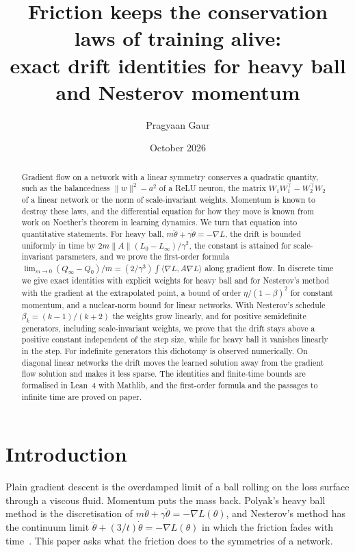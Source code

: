 \documentclass[11pt]{article}
\title{Friction keeps the conservation laws of training alive:\\ exact drift identities for heavy ball and Nesterov momentum}
\author{Pragyaan Gaur}
\date{October 2026}
\theoremstyle{remark}
\theoremstyle{definition}
\newcommand{\ip}[2]{\langle #1,#2\rangle}
\begin{document}
\maketitle

\begin{abstract}
Gradient flow on a network with a linear symmetry conserves a quadratic quantity, such as the balancedness $\|w\|^2-a^2$ of a ReLU neuron, the matrix $W_1W_1^\top-W_2^\top W_2$ of a linear network or the norm of scale-invariant weights. Momentum is known to destroy these laws, and the differential equation for how they move is known from work on Noether's theorem in learning dynamics. We turn that equation into quantitative statements. For heavy ball, $m\ddot\theta+\gamma\dot\theta=-\nabla L$, the drift is bounded uniformly in time by $2m\|A\|(L_0-L_\infty)/\gamma^2$, the constant is attained for scale-invariant parameters, and we prove the first-order formula $\lim_{m\to0}(Q_\infty-Q_0)/m=(2/\gamma^3)\int\ip{\nabla L}{A\nabla L}$ along gradient flow. In discrete time we give exact identities with explicit weights for heavy ball and for Nesterov's method with the gradient at the extrapolated point, a bound of order $\eta/(1-\beta)^2$ for constant momentum, and a nuclear-norm bound for linear networks. With Nesterov's schedule $\beta_k=(k-1)/(k+2)$ the weights grow linearly, and for positive semidefinite generators, including scale-invariant weights, we prove that the drift stays above a positive constant independent of the step size, while for heavy ball it vanishes linearly in the step. For indefinite generators this dichotomy is observed numerically. On diagonal linear networks the drift moves the learned solution away from the gradient flow solution and makes it less sparse. The identities and finite-time bounds are formalised in Lean~4 with Mathlib, and the first-order formula and the passages to infinite time are proved on paper.
\end{abstract}

\section{Introduction}

Plain gradient descent is the overdamped limit of a ball rolling on the loss surface through a viscous fluid. Momentum puts the mass back. Polyak's heavy ball method is the discretisation of $m\ddot\theta+\gamma\dot\theta=-\nabla L(\theta)$, and Nesterov's method has the continuum limit $\ddot\theta+(3/t)\dot\theta=-\nabla L(\theta)$ in which the friction fades with time~\cite{polyak1964,su2016}. This paper asks what the friction does to the symmetries of a network.
\end{document}
